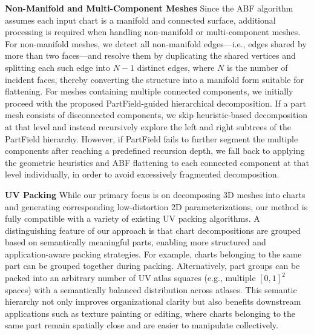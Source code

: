 \noindent \textbf{Non-Manifold and Multi-Component Meshes} Since the ABF algorithm assumes each input chart is a manifold and connected surface, additional processing is required when handling non-manifold or multi-component meshes. For non-manifold meshes, we detect all non-manifold edges—i.e., edges shared by more than two faces—and resolve them by duplicating the shared vertices and splitting each such edge into $N-1$ distinct edges, where $N$ is the number of incident faces, thereby converting the structure into a manifold form suitable for flattening. For meshes containing multiple connected components, we initially proceed with the proposed PartField-guided hierarchical decomposition. If a part mesh consists of disconnected components, we skip heuristic-based decomposition at that level and instead recursively explore the left and right subtrees of the PartField hierarchy. However, if PartField fails to further segment the multiple components after reaching a predefined recursion depth, we fall back to applying the geometric heuristics and ABF flattening to each connected component at that level individually, in order to avoid excessively fragmented decomposition.

\noindent \textbf{UV Packing} While our primary focus is on decomposing 3D meshes into charts and generating corresponding low-distortion 2D parameterizations, our method is fully compatible with a variety of existing UV packing algorithms. A distinguishing feature of our approach is that chart decompositions are grouped based on semantically meaningful parts, enabling more structured and application-aware packing strategies. 
For example, charts belonging to the same part can be grouped together during packing. 
Alternatively, part groups can be packed into an arbitrary number of UV atlas squares (e.g., multiple $[0,1]^2$ spaces) with a semantically balanced distribution across atlases.
This semantic hierarchy not only improves organizational clarity but also benefits downstream applications such as texture painting or editing, where charts belonging to the same part remain spatially close and are easier to manipulate collectively.
